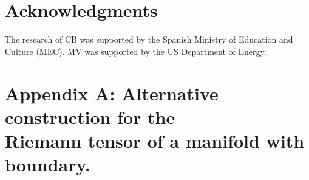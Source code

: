 \documentclass[a4paper,12pt]{article}
\begin{document}
\section*{Acknowledgments}

The research of CB was supported by the Spanish Ministry of Education
and Culture (MEC). MV was supported by the US Department of Energy.

\appendix
\section*{Appendix A: Alternative construction for the \\
Riemann tensor of a manifold with boundary.}
\end{document}
